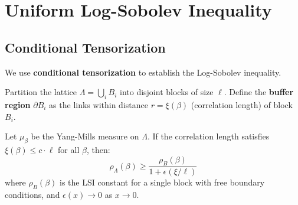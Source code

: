 \section{Uniform Log-Sobolev Inequality}
\label{part:uniform-lsi}
\label{sec:hierarchical-lsi-app143}  %
\label{part:gap3-rigorous}  %

\subsection{Conditional Tensorization}
\label{sec:conditional-tensorization}

We use \textbf{conditional tensorization} to establish the Log-Sobolev inequality.

\begin{definition}
\label{def:block-buffer}
Partition the lattice $\Lambda = \bigcup_i B_i$ into disjoint blocks of size $\ell$.
Define the \textbf{buffer region} $\partial B_i$ as the links within distance 
$r = \xi(\beta)$ (correlation length) of block $B_i$.
\end{definition}

\begin{theorem}
\label{thm:conditional-tensorization-app143}
\label{thm:block-zeg-app143}  %
\label{thm:zegarlinski-criterion-app143}  %
Let $\mu_\beta$ be the Yang-Mills measure on $\Lambda$. 
If the correlation length satisfies $\xi(\beta) \leq c \cdot \ell$ for all $\beta$,
then:
\begin{equation}
\rho_\Lambda(\beta) \geq \frac{\rho_{B}(\beta)}{1 + \epsilon(\xi/\ell)}
\end{equation}
where $\rho_B(\beta)$ is the LSI constant for a single block with free boundary
conditions, and $\epsilon(x) \to 0$ as $x \to 0$.
\end{theorem}

